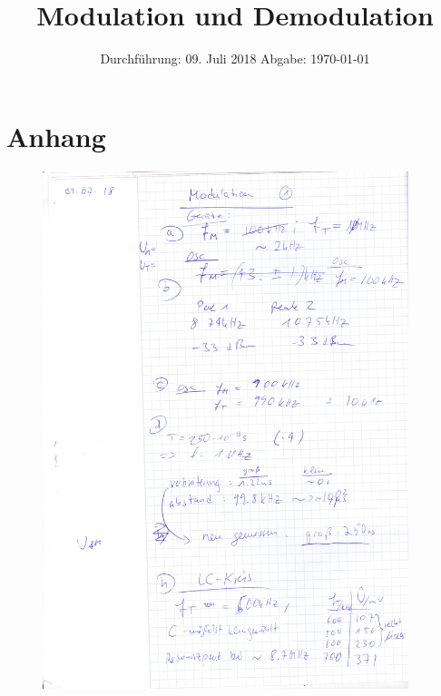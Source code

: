 

\subject{V - 59}
\title{Modulation und Demodulation}
\date{
  Durchführung: 09. Juli 2018
  \hspace{3em}
  Abgabe: \today
}



\maketitle
\thispagestyle{empty}
\tableofcontents
\newpage






\printbibliography

\newpage

\section{Anhang}
\begin{figure}
  \centering
  \includegraphics[width=0.95\textwidth]{messheft/seite_1.jpg}
  \caption{}
\label{fig:p1}
\end{figure}

